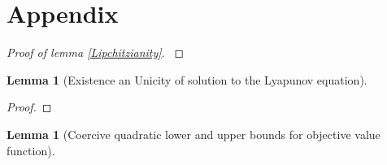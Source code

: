 \documentclass[12pt]{article}
\newtheorem{lemma}[theorem]{Lemma}
\theoremstyle{definition}
\theoremstyle{remark}
\begin{document}
\section{Appendix}
\printbibliography
\begin{proof}[Proof of lemma \ref{Lipchitzianity}]
\cite{RRLB-linear-MPC}
\end{proof}

\begin{lemma}[Existence an Unicity of solution to the Lyapunov equation]
	
\end{lemma}

\begin{proof}
	
\end{proof}

\begin{lemma}[Coercive quadratic lower and upper bounds for objective value function]

\end{lemma}
\end{document}

